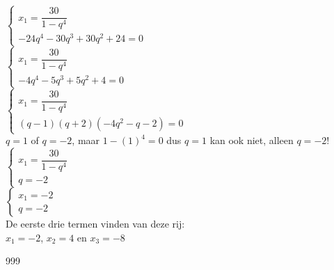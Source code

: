 \documentclass[a4paper]{article}
\begin{document}
$\left \{
\begin{array}{l}
x_{1}=\dfrac{30}{1-q^4} \\
-24q^4-30q^3+30q^2+24=0
\end{array}
\right .$\\

$\left \{
\begin{array}{l}
x_{1}=\dfrac{30}{1-q^4} \\
-4q^4-5q^3+5q^2+4=0
\end{array}
\right .$\\

$\left \{
\begin{array}{l}
x_{1}=\dfrac{30}{1-q^4} \\
(q-1)(q+2)(-4q^2-q-2)=0
\end{array}
\right .$\\

$q=1$ of $q=-2$, maar $1-(1)^4=0$ dus $q=1$ kan ook niet, alleen $q=-2$!\\

$\left \{
\begin{array}{l}
x_{1}=\dfrac{30}{1-q^4} \\
q=-2
\end{array}
\right .$\\

$\left \{
\begin{array}{l}
x_{1}=-2 \\
q=-2
\end{array}
\right .$\\

De eerste drie termen vinden van deze rij:\\

$x_{1}=-2$, $x_{2}=4$ en $x_{3}=-8$\\


\begin{thebibliography}{999}
\end{thebibliography}
\end{document}
